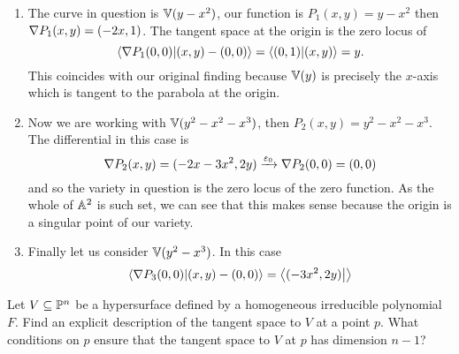 \documentclass[12pt]{memoir}
\begin{document}
\begin{ptcbr}
\begin{enumerate}
	\item The curve in question is $\mathbb{V}(y-x^2)$, our function is $P_1(x,y)=y-x^2$ then $\nabla P_1(x,y)=(-2x,1)$. The tangent space at the origin is the zero locus of 
	$$\braket{\nabla P_1(0,0)}{(x,y)-(0,0)}=\braket{(0,1)}{(x,y)}=y.$$
	This coincides with our original finding because $\mathbb{V}(y)$ is precisely the $x$-axis which is tangent to the parabola at the origin.
	\item Now we are working with $\mathbb{V}(y^2-x^2-x^3)$, then $P_2(x,y)=y^2-x^2-x^3$. The differential in this case is 
	$$\nabla P_2(x,y)=(-2x-3x^2,2y)\xrightarrow{\varepsilon_0}\nabla P_2(0,0)=(0,0)$$
	and so the variety in question is the zero locus of the zero function. As the whole of $\mathbb{A}^2$ is such set, we can see that this makes sense because the origin is a singular point of our variety. 
	\item Finally let us consider $\mathbb{V}(y^2-x^3)$. In this case 
	$$\braket{\nabla P_3(0,0)}{(x,y)-(0,0)}=\braket{(-3x^2,2y)}{}$$
\end{enumerate}
\end{ptcbr}
\begin{Ej}
	Let $V\subseteq\mathbb{P}^n$ be a hypersurface defined by a homogeneous
	irreducible polynomial $F$. Find an explicit description of the tangent space
	to $V$ at a point $p$. What conditions on $p$ ensure that the tangent space to
	$V$ at $p$ has dimension $n - 1$?
\end{Ej}

\begin{ptcbr}

\end{ptcbr}
\end{document}

